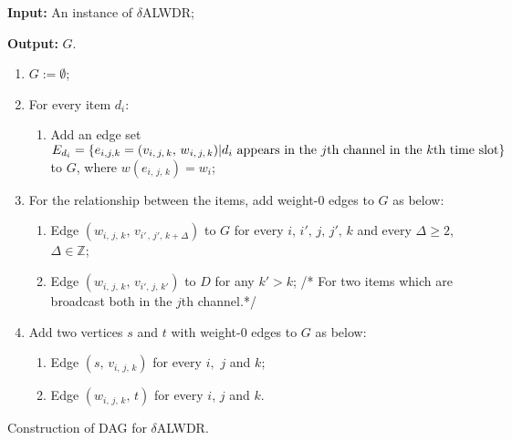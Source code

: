 \documentclass[11pt,english,onecolumn,draftcls]{IEEEtran}
\theoremstyle{plain}
\theoremstyle{plain}
\theoremstyle{plain}
\theoremstyle{plain}
\begin{document}
\begin{algorithm}
\textbf{Input: }An instance of $\delta$ALWDR;

\textbf{Output:} $G$.
\begin{enumerate}
\item $G:=\emptyset$;
\item For every item $d_{i}$:

\begin{enumerate}
\item Add an edge set $E_{d_{i}}=\{e_{i,j,k}=(v_{i,\, j,\, k},\, w{}_{i,\, j,\, k})\vert d_{i}\mbox{ appears in the \ensuremath{j}th channel in the }k\mbox{th time slot}\}$
to $G$, where $w(e_{i,\, j,\, k})=w_{i}$;
\end{enumerate}
\item For the relationship between the items, add weight-0 edges to $G$
as below:

\begin{enumerate}
\item Edge $(w{}_{i,\, j,\, k},\, v_{i'\,,\, j',\, k+\Delta})$ to $G$
for every $i,\, i',\, j,\, j',\, k$ and every $\Delta\geq2$, $\Delta\in\mathbb{Z}$;
\item Edge $(w_{i,\, j,\, k},\, v_{i',\, j,\, k'})$ to $D$ for any $k'>k$;
/{*} For two items which are broadcast both in the $j$th channel.{*}/
\end{enumerate}
\item Add two vertices $s$ and $t$ with weight-0 edges to $G$ as below:

\begin{enumerate}
\item Edge $(s,\, v_{i,\, j,\, k})$ for every $i,$ $j$ and $k$;
\item Edge $(w{}_{i,\, j,\, k},\, t)$ for every $i$, $j$ and $k$.
\end{enumerate}
\end{enumerate}
\protect\caption{\label{alg:1Construction-of-Auxiliary}Construction of DAG for $\delta$ALWDR. }
\end{algorithm}
\end{document}
